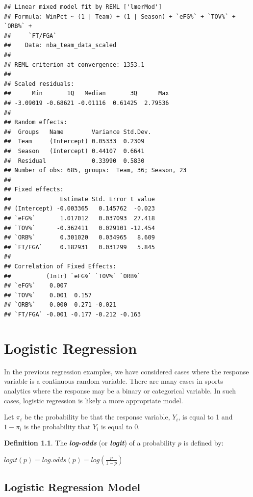 \documentclass[
  11pt,
]{book}
\theoremstyle{definition}
\newtheorem{definition}{Definition}[chapter]
\theoremstyle{definition}
\theoremstyle{definition}
\theoremstyle{definition}
\theoremstyle{remark}
\begin{document}
\begin{verbatim}
## Linear mixed model fit by REML ['lmerMod']
## Formula: WinPct ~ (1 | Team) + (1 | Season) + `eFG%` + `TOV%` + `ORB%` +  
##     `FT/FGA`
##    Data: nba_team_data_scaled
## 
## REML criterion at convergence: 1353.1
## 
## Scaled residuals: 
##      Min       1Q   Median       3Q      Max 
## -3.09019 -0.68621 -0.01116  0.61425  2.79536 
## 
## Random effects:
##  Groups   Name        Variance Std.Dev.
##  Team     (Intercept) 0.05333  0.2309  
##  Season   (Intercept) 0.44107  0.6641  
##  Residual             0.33990  0.5830  
## Number of obs: 685, groups:  Team, 36; Season, 23
## 
## Fixed effects:
##              Estimate Std. Error t value
## (Intercept) -0.003365   0.145762  -0.023
## `eFG%`       1.017012   0.037093  27.418
## `TOV%`      -0.362411   0.029101 -12.454
## `ORB%`       0.301020   0.034965   8.609
## `FT/FGA`     0.182931   0.031299   5.845
## 
## Correlation of Fixed Effects:
##          (Intr) `eFG%` `TOV%` `ORB%`
## `eFG%`    0.007                     
## `TOV%`    0.001  0.157              
## `ORB%`    0.000  0.271 -0.021       
## `FT/FGA` -0.001 -0.177 -0.212 -0.163
\end{verbatim}

\hypertarget{logistic-regression}{%
\chapter{Logistic Regression}\label{logistic-regression}}

In the previous regression examples, we have considered cases where the response variable is a continuous random variable. There are many cases in sports analytics where the response may be a binary or categorical variable. In such cases, logistic regression is likely a more appropriate model.

Let \(\pi_i\) be the probability be that the response variable, \(Y_i\), is equal to 1 and \(1-\pi_i\) is the probability that \(Y_i\) is equal to 0.

\begin{definition}
The \textbf{\emph{log-odds}} (or \textbf{\emph{logit}}) of a probability \(p\) is defined by:

\(logit(p) = log.odds(p) = log\left(\frac{p}{1-p}\right)\)
\end{definition}

\hypertarget{logistic-regression-model}{%
\section{Logistic Regression Model}\label{logistic-regression-model}}
\end{document}
